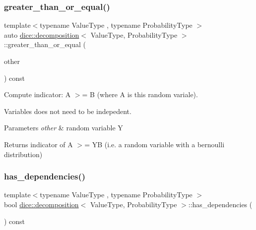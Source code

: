 \subsubsection{\texorpdfstring{greater\+\_\+than\+\_\+or\+\_\+equal()}{greater\_than\_or\_equal()}}
{\footnotesize\ttfamily template$<$typename Value\+Type , typename Probability\+Type $>$ \\
auto \mbox{\hyperlink{classdice_1_1decomposition}{dice\+::decomposition}}$<$ Value\+Type, Probability\+Type $>$\+::greater\+\_\+than\+\_\+or\+\_\+equal (\begin{DoxyParamCaption}\item[{const \mbox{\hyperlink{classdice_1_1decomposition}{decomposition}}$<$ Value\+Type, Probability\+Type $>$ \&}]{other }\end{DoxyParamCaption}) const\hspace{0.3cm}{\ttfamily [inline]}}



Compute indicator\+: A $>$= B (where A is this random variale). 

Variables does not need to be indepedent.


\begin{DoxyParams}{Parameters}
{\em other} & random variable Y\\
\hline
\end{DoxyParams}
\begin{DoxyReturn}{Returns}
indicator of A $>$= YB (i.\+e. a random variable with a bernoulli distribution) 
\end{DoxyReturn}
\mbox{\label{classdice_1_1decomposition_aa3fe4f89f0ae6361889272ee098c02a8}} 
\subsubsection{\texorpdfstring{has\+\_\+dependencies()}{has\_dependencies()}}
{\footnotesize\ttfamily template$<$typename Value\+Type , typename Probability\+Type $>$ \\
bool \mbox{\hyperlink{classdice_1_1decomposition}{dice\+::decomposition}}$<$ Value\+Type, Probability\+Type $>$\+::has\+\_\+dependencies (\begin{DoxyParamCaption}{ }\end{DoxyParamCaption}) const\hspace{0.3cm}{\ttfamily [inline]}}




